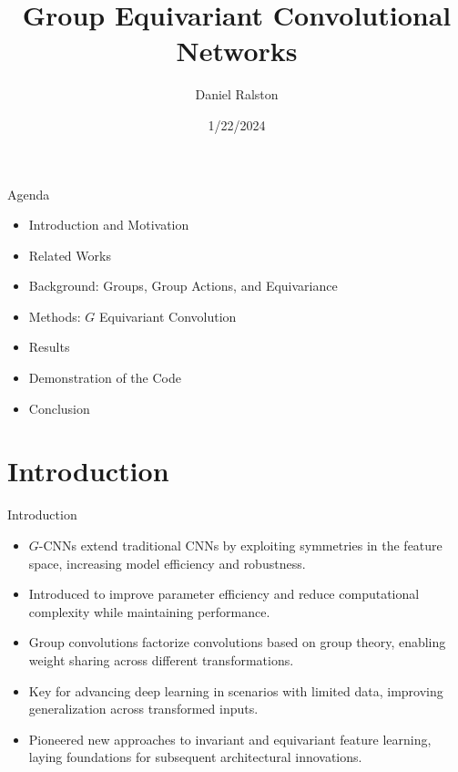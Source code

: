\documentclass{beamer}
\title{Group Equivariant Convolutional Networks}
\author{Daniel Ralston}
\date{1/22/2024}
\begin{document}
\begin{frame}
  \titlepage
\end{frame}


\begin{frame}{Agenda}
    \begin{itemize}
        \item Introduction and Motivation
        \item Related Works
        \item Background: Groups, Group Actions, and Equivariance
        \item Methods: $G$ Equivariant Convolution
        \item Results
        \item Demonstration of the Code
        \item Conclusion
    \end{itemize}
\end{frame}

\section{Introduction}
\begin{frame}{Introduction}
    \begin{itemize}
        \item $G$-CNNs extend traditional CNNs by exploiting symmetries in the feature space, increasing model efficiency and robustness.
        \item Introduced to improve parameter efficiency and reduce computational complexity while maintaining performance.
        \item Group convolutions factorize convolutions based on group theory, enabling weight sharing across different transformations.
        \item Key for advancing deep learning in scenarios with limited data, improving generalization across transformed inputs.
        \item Pioneered new approaches to invariant and equivariant feature learning, laying foundations for subsequent architectural innovations.
    \end{itemize}
\end{frame}

\end{document}
